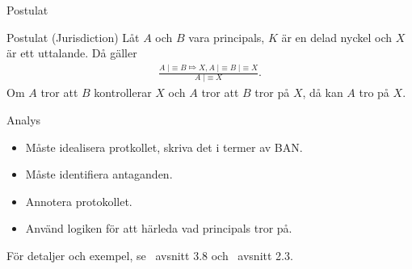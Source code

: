 \documentclass{beamer}
\theoremstyle{definition}
\newenvironment{axiom}[1]{\begin{block}{Postulat (#1)}}{\end{block}}
\theoremstyle{remark}
\DeclareMathOperator{\believes}{|\!\!\!\equiv}
\DeclareMathOperator{\controls}{\Mapsto}
\begin{document}
\begin{frame}{Postulat}
  \begin{axiom}{Jurisdiction}
    Låt \(A\) och \(B\) vara principals, \(K\) är en delad nyckel och \(X\) är 
    ett uttalande.
    Då gäller
    \begin{align*}
      \frac{A\believes B\controls X, A\believes B\believes X}%
        {A\believes X}.
    \end{align*}
    Om \(A\) tror att \(B\) kontrollerar \(X\) och \(A\) tror att \(B\) tror på 
    \(X\),
    då kan \(A\) tro på \(X\).
  \end{axiom}
\end{frame}

\begin{frame}{Analys}
  \begin{itemize}
    \item Måste idealisera protkollet, skriva det i termer av BAN\@.
    \item Måste identifiera antaganden.
    \item Annotera protokollet.
    \item Använd logiken för att härleda vad principals tror på.
  \end{itemize}
  För detaljer och exempel, se~\cite{Anderson2008sea} avsnitt 3.8 
  och~\cite{Syverson2001tlo} avsnitt 2.3.
\end{frame}
\end{document}
